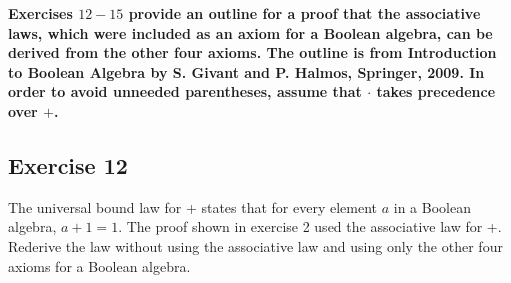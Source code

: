 \documentclass[14pt]{extarticle}
\newcommand{\cy}{\color{cyan}}
\begin{document}
{\bf \cy Exercises $12-15$ provide an outline for a proof that the associative laws, which were included as an axiom for a Boolean algebra, can be derived from the other four axioms. The outline is from Introduction to Boolean Algebra by S. Givant and P. Halmos, Springer, 2009. In order to avoid unneeded parentheses, assume that $\cdot$ takes precedence over $+$.}

\subsection{Exercise 12}
The universal bound law for + states that for every element $a$ in a Boolean algebra, \(a + 1 = 1\). The proof shown in
exercise 2 used the associative law for +. Rederive the law without using the associative law and using only the other
four axioms for a Boolean algebra.
\end{document}
